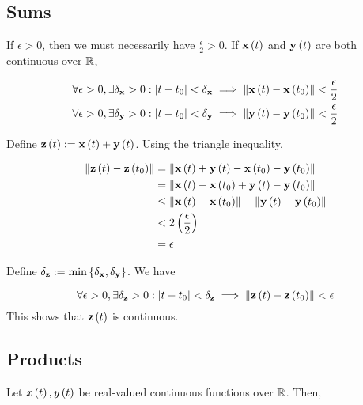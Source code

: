 \documentclass{article}
\begin{document}
\subsection*{Sums}

If $\epsilon > 0$, then we must necessarily have $\frac{\epsilon}{2} > 0$.
If $\textbf{x} \left ( t \right)$ and $\textbf{y} \left ( t \right)$ are both continuous over $\mathbb R$,

\begin{align*}
  \forall \epsilon > 0, \exists \delta_{\textbf{x}} > 0 &: \left\lvert t - t_0 \right\rvert < \delta_{\textbf{x}} \implies \left\lVert \textbf{x} \left ( t \right) - \textbf{x} \left ( t_0 \right)\right\rVert < \frac{\epsilon}{2} \\
  \forall \epsilon > 0, \exists \delta_{\textbf{y}} > 0 &: \left\lvert t - t_0 \right\rvert < \delta_{\textbf{y}} \implies \left\lVert\textbf{y} \left ( t \right) - \textbf{y} \left ( t_0 \right)\right\rVert < \frac{\epsilon}{2} \\
\end{align*}

Define $\textbf{z} \left ( t \right) := \textbf{x} \left ( t \right) + \textbf{y} \left ( t \right)$.
Using the triangle inequality,

\begin{align*}
  \left\lVert\textbf{z} \left ( t \right) - \textbf{z} \left ( t_0 \right)\right\rVert & = \left\lVert\textbf{x} \left ( t \right) + \textbf{y} \left ( t \right) - \textbf{x} \left ( t_0 \right) - \textbf{y} \left ( t_0 \right)\right\rVert \\
                                             & = \left\lVert\textbf{x} \left ( t \right) - \textbf{x} \left ( t_0 \right) + \textbf{y} \left ( t \right) - \textbf{y} \left ( t_0 \right)\right\rVert \\
                                             & \leq \left\lVert\textbf{x} \left ( t \right) - \textbf{x} \left ( t_0 \right)\right\rVert + \left\lVert\textbf{y} \left ( t \right) - \textbf{y} \left ( t_0 \right)\right\rVert \\
                                            & < 2 \left ( \frac{\epsilon}{2} \right) \\
                                            & = \epsilon \\
\end{align*}

Define $\delta_{\textbf{z}} := \min \left \{ \delta_{\textbf{x}}, \delta_{\textbf{y}} \right \}$.
We have

$$
\forall \epsilon > 0, \exists \delta_{\textbf{z}} > 0 : \left\lvert t - t_0 \right\rvert < \delta_{\textbf{z}} \implies \left\lVert \textbf{z} \left ( t \right) - \textbf{z} \left ( t_0 \right)\right\rVert < \epsilon
$$
This shows that $\textbf{z} \left ( t \right)$ is continuous.

\subsection*{Products}

Let $x \left ( t \right), y \left ( t \right)$ be real-valued continuous functions over $\mathbb R$.
Then,
\end{document}
